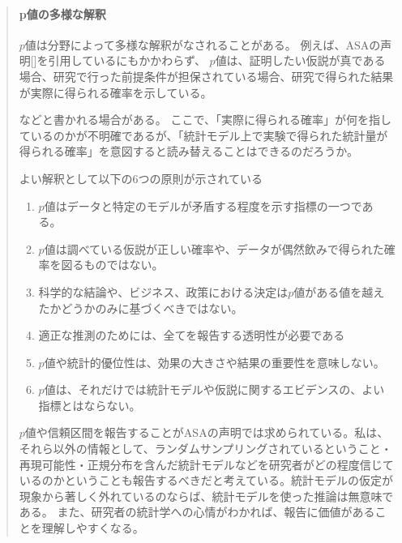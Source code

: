 \begin{mybox}
    \begin{quote}
    \paragraph{p値の多様な解釈}
$p$値は分野によって多様な解釈がなされることがある\cite{published_papers/18436201,2020医療統計解析使いこなし実践ガイド}。
例えば、ASAの声明[\cite{ASA_JA}]を引用しているにもかかわらず、
$p$値は、証明したい仮説が真である場合、研究で行った前提条件が担保されている場合、研究で得られた結果が実際に得られる確率を示している\cite{2020医療統計解析使いこなし実践ガイド}。

などと書かれる場合がある。
ここで、「実際に得られる確率」が何を指しているのかが不明確であるが、「統計モデル上で実験で得られた統計量が得られる確率」を意図すると読み替えることはできるのだろうか。
\fi

よい解釈として以下の6つの原則が示されている\cite{published_papers/18436201}
\begin{enumerate}
    \item $p$値はデータと特定のモデルが矛盾する程度を示す指標の一つである。
    \item $p$値は調べている仮説が正しい確率や、データが偶然飲みで得られた確率を図るものではない。
    \item 科学的な結論や、ビジネス、政策における決定は$p$値がある値を越えたかどうかのみに基づくべきではない。
    \item 適正な推測のためには、全てを報告する透明性が必要である
    \item $p$値や統計的優位性は、効果の大きさや結果の重要性を意味しない。
    \item $p$値は、それだけでは統計モデルや仮説に関するエビデンスの、よい指標とはならない。
\end{enumerate}

    $p$値や信頼区間を報告することがASAの声明では求められている。私は、それら以外の情報として、ランダムサンプリングされているということ・再現可能性・正規分布を含んだ統計モデルなどを研究者がどの程度信じているのかということも報告するべきだと考えている。統計モデルの仮定が現象から著しく外れているのならば、統計モデルを使った推論は無意味である。
    また、研究者の統計学への心情がわかれば、報告に価値があることを理解しやすくなる。


\end{quote}
\end{mybox}
